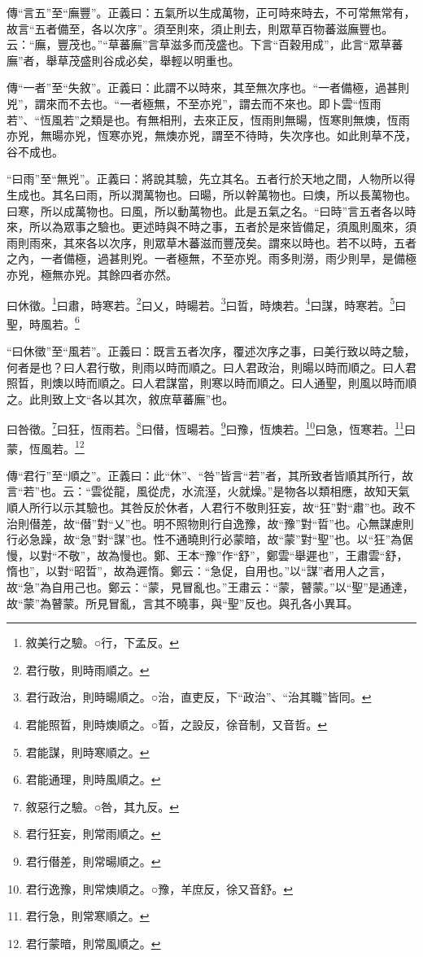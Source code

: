 {\noindent\zhuan{}\fzbyks 傳“言五”至“廡豐”。正義曰：五氣所以生成萬物，正可時來時去，不可常無常有，故言“五者備至，各以次序”。須至則來，須止則去，則眾草百物蕃滋廡豐也。云：“廡，豐茂也。”“草蕃廡”言草滋多而茂盛也。下言“百穀用成”，此言“眾草蕃廡”者，舉草茂盛則谷成必矣，舉輕以明重也。 \par}

{\noindent\zhuan{}\fzbyks 傳“一者”至“失敘”。正義曰：此謂不以時來，其至無次序也。“一者備極，過甚則兇”，謂來而不去也。“一者極無，不至亦兇”，謂去而不來也。即卜雲“恆雨若”、“恆風若”之類是也。有無相刑，去來正反，恆雨則無暘，恆寒則無燠，恆雨亦兇，無暘亦兇，恆寒亦兇，無燠亦兇，謂至不待時，失次序也。如此則草不茂，谷不成也。 \par}

{\noindent\shu{}\fzkt “曰雨”至“無兇”。正義曰：將說其驗，先立其名。五者行於天地之間，人物所以得生成也。其名曰雨，所以潤萬物也。曰暘，所以幹萬物也。曰燠，所以長萬物也。曰寒，所以成萬物也。曰風，所以動萬物也。此是五氣之名。“曰時”言五者各以時來，所以為眾事之驗也。更述時與不時之事，五者於是來皆備足，須風則風來，須雨則雨來，其來各以次序，則眾草木蕃滋而豐茂矣。謂來以時也。若不以時，五者之內，一者備極，過甚則兇。一者極無，不至亦兇。雨多則澇，雨少則旱，是備極亦兇，極無亦兇。其餘四者亦然。 \par}

曰休徵。\footnote{敘美行之驗。○行，下孟反。}曰肅，時寒若。\footnote{君行敬，則時雨順之。}曰乂，時暘若。\footnote{君行政治，則時暘順之。○治，直吏反，下“政治”、“治其職”皆同。}曰晢，時燠若。\footnote{君能照晢，則時燠順之。○晢，之設反，徐音制，又音哲。}曰謀，時寒若。\footnote{君能謀，則時寒順之。}曰聖，時風若。\footnote{君能通理，則時風順之。}

{\noindent\shu{}\fzkt “曰休徵”至“風若”。正義曰：既言五者次序，覆述次序之事，曰美行致以時之驗，何者是也？曰人君行敬，則雨以時而順之。曰人君政治，則暘以時而順之。曰人君照晢，則燠以時而順之。曰人君謀當，則寒以時而順之。曰人通聖，則風以時而順之。此則致上文“各以其次，敘庶草蕃廡”也。 \par}

曰咎徵。\footnote{敘惡行之驗。○咎，其九反。}曰狂，恆雨若。\footnote{君行狂妄，則常雨順之。}曰僣，恆暘若。\footnote{君行僣差，則常暘順之。}曰豫，恆燠若。\footnote{君行逸豫，則常燠順之。○豫，羊庶反，徐又音舒。}曰急，恆寒若。\footnote{君行急，則常寒順之。}曰蒙，恆風若。\footnote{君行蒙暗，則常風順之。}

{\noindent\zhuan{}\fzbyks 傳“君行”至“順之”。正義曰：此“休”、“咎”皆言“若”者，其所致者皆順其所行，故言“若”也。云：“雲從龍，風從虎，水流溼，火就燥。”是物各以類相應，故知天氣順人所行以示其驗也。其咎反於休者，人君行不敬則狂妄，故“狂”對“肅”也。政不治則僣差，故“僣”對“乂”也。明不照物則行自逸豫，故“豫”對“晢”也。心無謀慮則行必急躁，故“急”對“謀”也。性不通曉則行必蒙暗，故“蒙”對“聖”也。以“狂”為倨慢，以對“不敬”，故為慢也。鄭、王本“豫”作“舒”，鄭雲“舉遲也”，王肅雲“舒，惰也”，以對“昭晢”，故為遲惰。鄭云：“急促，自用也。”以“謀”者用人之言，故“急”為自用己也。鄭云：“蒙，見冒亂也。”王肅云：“蒙，瞽蒙。”以“聖”是通達，故“蒙”為瞽蒙。所見冒亂，言其不曉事，與“聖”反也。與孔各小異耳。 \par}

